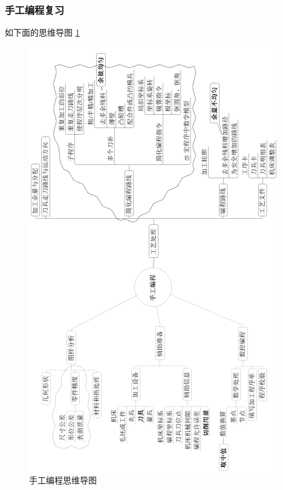 \subsubsection{手工编程复习} 
如下面的思维导图 \ref{手工编程思维导图}
\begin{figure}[!hbtp]	
	\includegraphics{images/tu1} 
	\caption{手工编程思维导图}\label{手工编程思维导图}
\end{figure}

